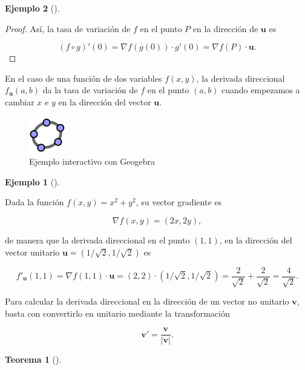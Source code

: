 \documentclass[
  a4paper,
]{scrreport}
\theoremstyle{definition}
\newtheorem{example}{Ejemplo}[chapter]
\theoremstyle{plain}
\theoremstyle{definition}
\theoremstyle{definition}
\theoremstyle{plain}
\newtheorem{theorem}{Teorema}[chapter]
\theoremstyle{plain}
\theoremstyle{remark}
\begin{document}
\begin{example}[]
\begin{tcolorbox}
\begin{proof}
Así, la tasa de variación de \(f\) en el punto \(P\) en la dirección de
\(\mathbf{u}\) es

\[
(f\circ g)'(0) = \nabla f(g(0))\cdot g'(0) = \nabla f(P)\cdot \mathbf{u}.
\]
\end{proof}

\end{tcolorbox}

En el caso de una función de dos variables \(f(x,y)\), la derivada
direccional \(f_{\mathbf{u}}(a,b)\) da la tasa de variación de \(f\) en
el punto \((a,b)\) cuando empezamos a cambiar \(x\) e \(y\) en la
dirección del vector \(\mathbf{u}\).

\begin{figure}[H]

{\centering \includegraphics{img/logos/logo-geogebra.png}

}

\caption{Ejemplo interactivo con Geogebra}

\end{figure}%

\begin{example}[]\protect\hypertarget{exm-derivada-direccional}{}\label{exm-derivada-direccional}

Dada la función \(f(x,y) = x^2+y^2\), su vector gradiente es

\[
\nabla f(x,y) = (2x,2y),
\]

de manera que la derivada direccional en el punto \((1,1)\), en la
dirección del vector unitario \(\mathbf{u}=(1/\sqrt{2},1/\sqrt{2})\) es

\[
f'_{\mathbf{u}}(1,1) = \nabla f(1,1)\cdot \mathbf{u} = (2,2)\cdot(1/\sqrt{2},1/\sqrt{2}) = \frac{2}{\sqrt{2}}+\frac{2}{\sqrt{2}} = \frac{4}{\sqrt{2}}.
\]

\end{example}

Para calcular la derivada direccional en la dirección de un vector no
unitario \(\mathbf{v}\), basta con convertirlo en unitario mediante la
transformación

\[
\mathbf{v'}=\frac{\mathbf{v}}{|\mathbf{v}|}.
\]

\begin{theorem}[]\protect\hypertarget{thm-gradiente-direccion-maximo-crecimiento}{}\label{thm-gradiente-direccion-maximo-crecimiento}


\end{theorem}
\end{example}
\end{document}
